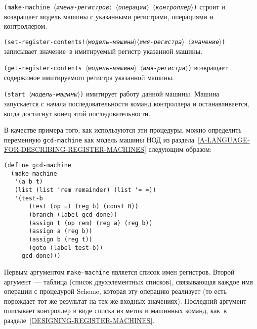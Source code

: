 \begin{plainlist}
\sloppy

\item
{\tt (make-machine \textit{$\langle$имена-регистров$\rangle$} \textit{$\langle$операции$\rangle$} \textit{$\langle$контроллер$\rangle$})}%
 строит и возвращает модель машины с указанными регистрами, операциями
и контроллером.

\item
{\tt (set-register-contents!\hfill\textit{$\langle$модель-машины$\rangle$}\hfill\textit{$\langle$имя-регистра$\rangle$} \hfill \textit{$\langle$значе\-ние$\rangle$})}%
 записывает значение~в имитируемый регистр указанной машины.

\item
{\tt (get-register-contents \textit{$\langle$модель-машины$\rangle$} \textit{$\langle$имя-регистра$\rangle$})} 
воз\-вра\-ща\-ет содержимое имитируемого регистра указанной машины.

\item
{\tt (start \textit{$\langle$модель-машины$\rangle$})}  имитирует работу данной машины. Машина запускается с начала
последовательности команд контроллера и останавливается, когда
достигнут конец этой последовательности.
\sloppy
\end{plainlist}

В качестве примера того, как используются эти процедуры,
можно определить переменную {\tt gcd-machine} как модель машины
НОД из раздела~\ref{A-LANGUAGE-FOR-DESCRIBING-REGISTER-MACHINES}
следующим образом:

\begin{Verbatim}[fontsize=\small]
(define gcd-machine
  (make-machine
   '(a b t)
   (list (list 'rem remainder) (list '= =))
   '(test-b
       (test (op =) (reg b) (const 0))
       (branch (label gcd-done))
       (assign t (op rem) (reg a) (reg b))
       (assign a (reg b))
       (assign b (reg t))
       (goto (label test-b))
     gcd-done)))
\end{Verbatim}
Первым аргументом {\tt make-machine} является список имен
регистров.  Второй аргумент~--- таблица (список двухэлементных
списков), связывающая каждое имя операции с процедурой Scheme,
которая эту операцию реализует (то есть порождает тот же результат на
тех же входных значениях).  Последний аргумент описывает контроллер
в виде списка из меток и машинных команд, как~в 
разделе~\ref{DESIGNING-REGISTER-MACHINES}.

